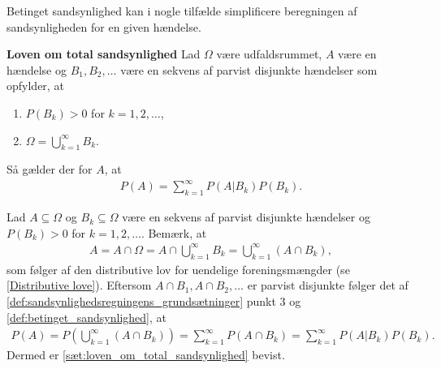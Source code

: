 Betinget sandsynlighed kan i nogle tilfælde simplificere beregningen af sandsynligheden for en given hændelse. 

\begin{minipage}\textwidth
\begin{thmx} \textbf{Loven om total sandsynlighed} \label{sæt:loven_om_total_sandsynlighed} %
\newline
Lad $\Omega$ være udfaldsrummet, $A$ være en hændelse og $B_1,B_2,\dots$ være en sekvens af parvist disjunkte hændelser som opfylder, at
\begin{enumerate}
\item $P(B_k)>0$ for $k=1,2,\dots$,
\item $\Omega=\displaystyle\bigcup_{k=1}^\infty B_k$.
\end{enumerate}
Så gælder der for $A$, at
\begin{align*}
    P(A)=\sum_{k=1}^\infty P(A|B_k)P(B_k).
\end{align*}
\end{thmx}
\end{minipage}
\begin{bev} \textbf{} %
\newline
Lad $A\subseteq \Omega$ og $B_k \subseteq \Omega $ være en sekvens af parvist disjunkte hændelser og $P(B_k)>0$ for $k=1,2,\dots$. Bemærk, at
\begin{align*}
    A=A\cap \Omega=A\cap\bigcup_{k=1}^\infty B_k=\bigcup_{k=1}^\infty(A\cap B_k),
\end{align*}
som følger af den distributive lov for uendelige foreningsmængder (se \autoref{Distributive love}). 
Eftersom $A\cap B_1,A\cap B_2,\dots$ er parvist disjunkte følger det af \autoref{def:sandsynlighedsregningens_grundsætninger} punkt 3 og \autoref{def:betinget_sandsynlighed}, at
\begin{align*}
    P(A)=P\left(\bigcup_{k=1}^\infty(A\cap B_k)\right) =\sum_{k=1}^\infty P(A\cap B_k)=\sum_{k=1}^\infty P(A|B_k)P(B_k).
\end{align*}
Dermed er \autoref{sæt:loven_om_total_sandsynlighed} bevist.
\end{bev}


